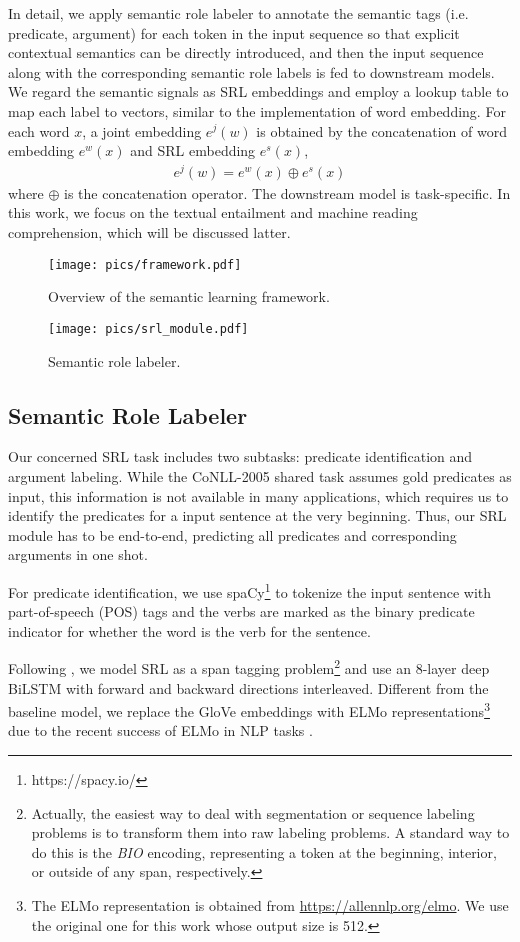 \documentclass[11pt]{article}
\begin{document}
In detail, we apply semantic role labeler to annotate the semantic tags (i.e. predicate, argument) for each token in the input sequence so that explicit contextual semantics can be directly introduced, and then the input sequence along with the corresponding semantic role labels is fed to downstream models. We regard the semantic signals as SRL embeddings and employ a lookup table to map each label to vectors, similar to the implementation of word embedding. For each word $x$, a joint embedding $e^{j}(w)$ is obtained by the concatenation of word embedding $e^{w}(x)$ and SRL embedding $e^{s}(x)$,
\begin{align*}	
e^{j}(w) = e^{w}(x) \oplus e^{s}(x)
\end{align*}
where $\oplus$ is the concatenation operator.
The downstream model is task-specific. In this work, we focus on the textual entailment and machine reading comprehension, which will be discussed latter.

\begin{figure}
	\centering
	\texttt{[image: pics/framework.pdf]}
	\caption{\label{fig:framework}Overview of the semantic learning framework.}
\end{figure}


\begin{figure*}
	\centering
	\texttt{[image: pics/srl\_module.pdf]}
	\caption{\label{fig:srl_module}Semantic role labeler.}
\end{figure*}

\subsection{Semantic Role Labeler}
Our concerned SRL task includes two subtasks: predicate identification and argument labeling. While the CoNLL-2005 shared task assumes gold predicates as input, this information is not available in many applications, which requires us to identify the predicates for a input sentence at the very beginning. Thus, our SRL module has to be end-to-end, predicting all predicates and corresponding arguments in one shot.

For predicate identification, we use spaCy\footnote{https://spacy.io/} to tokenize the input sentence with part-of-speech (POS) tags and the verbs are marked as the binary predicate indicator for whether the word is the verb for the sentence.

Following \citep{He2017Deep}, we model SRL as a span tagging problem\footnote{Actually, the easiest way to deal with segmentation or sequence labeling problems is to transform them into raw labeling problems. A standard way to do this is the \emph{BIO} encoding, representing a token at the beginning, interior, or outside of any span, respectively.} and use an 8-layer deep BiLSTM with forward and backward directions interleaved. Different from the baseline model, we replace the GloVe embeddings with ELMo representations\footnote{The ELMo representation is obtained from \url{https://allennlp.org/elmo}. We use the original one for this work whose output size is 512.} due to the recent success of ELMo in NLP tasks \citep{Peters2018ELMO}. 
\end{document}
